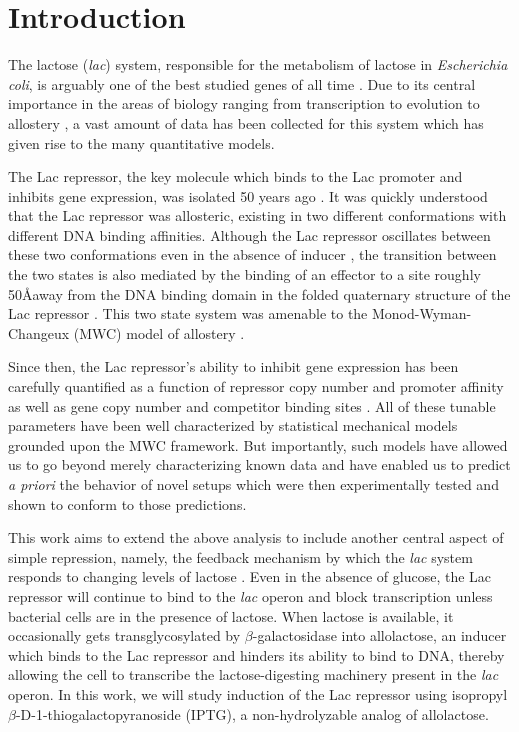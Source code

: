 \section*{Introduction}

The lactose (\textit{lac}) system, responsible for the metabolism of lactose in
\textit{Escherichia coli}, is arguably one of the best studied genes of all time
\cite{MullerHill1996a}. Due to its central importance in the areas of biology
ranging from transcription to evolution to allostery \cite{Razo-Mejia2014}
, a vast amount of data has been collected for this
system which has given rise to the many quantitative models.

The Lac repressor, the key molecule which binds to the Lac promoter and inhibits
gene expression, was isolated 50 years ago \cite{Gilbert1966}. It was quickly
understood that the Lac repressor was allosteric, existing in two different
conformations with different DNA binding affinities. Although the Lac repressor
oscillates between these two conformations even in the absence of inducer
, the transition between the two states is also mediated by the
binding of an effector to a site roughly 50\AA away from the DNA binding domain
in the folded quaternary structure of the Lac repressor \cite{Lewis1996}. This
two state system was amenable to the Monod-Wyman-Changeux (MWC) model of
allostery \cite{MONOD1965}.

Since then, the Lac repressor's ability to inhibit gene expression has been carefully quantified
as a function of repressor copy number and promoter affinity \cite{Garcia2011}
as well as gene copy number and competitor binding sites \cite{Weinert2014}. All
of these tunable parameters have been well characterized by statistical
mechanical models grounded upon the MWC framework. But importantly, such models
have allowed us to go beyond merely characterizing known data and have enabled
us to predict \textit{a priori} the behavior of novel setups which were then
experimentally tested and shown to conform to those predictions.

This work aims to extend the above analysis to include another central aspect of
simple repression, namely, the feedback mechanism by which the \textit{lac}
system responds to changing levels of lactose \cite{JACOB1961}. Even in the
absence of glucose, the Lac repressor will continue to bind to the \textit{lac}
operon and block transcription unless bacterial cells are in the presence of
lactose. When lactose is available, it occasionally gets transglycosylated by
$\beta$-galactosidase into allolactose, an inducer which binds to the Lac
repressor and hinders its ability to bind to DNA, thereby allowing the cell to
transcribe the lactose-digesting machinery present in the \textit{lac} operon.
In this work, we will study induction of the Lac repressor using isopropyl
$\beta$-D-1-thiogalactopyranoside (IPTG), a non-hydrolyzable analog of
allolactose.

